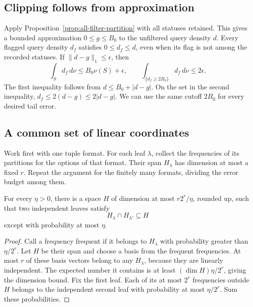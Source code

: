 \subsection{Clipping follows from approximation}\label{sec:partition-clipping}

Apply Proposition~\ref{prop:all-filter-partition} with all statuses retained. This
gives a bounded approximation \(0\le g\le B_0\) to the unfiltered query
density \(d\). Every flagged query density \(d_f\) satisfies
\(0\le d_f\le d\), even when its flag is not among the recorded statuses.
If \(\|d-g\|_1\le\epsilon\), then
\[
 \int_S d_f\,d\nu\le B_0\nu(S)+\epsilon,
 \qquad
 \int_{\{d_f\ge2B_0\}}d_f\,d\nu\le2\epsilon.
\]
The first inequality follows from \(d\le B_0+|d-g|\). On the set
in the second inequality, \(d_f\le2(d-g)\le2|d-g|\).
We can use the same cutoff \(2B_0\) for every desired tail error.

\subsection{A common set of linear coordinates}

Work first with one tuple format. For each leaf \(\lambda\), collect the
frequencies of its partitions for the options of that format. Their span
\(H_\lambda\) has dimension at most a fixed \(r\). Repeat the argument
for the finitely many formats, dividing the error budget among them.

\begin{lemma}\label{lem:common-frequencies}
For every \(\eta>0\), there is a space \(H\) of dimension at most
\(r2^r/\eta\), rounded up, such that two independent leaves satisfy
\begin{equation}\label{eq:frequency-intersection}
 H_\lambda\cap H_{\lambda'}\subseteq H
\end{equation}
except with probability at most \(\eta\).
\end{lemma}
\begin{proof}
Call a frequency frequent if it belongs to \(H_\lambda\) with
probability greater than \(\eta/2^r\). Let \(H\) be their span and
choose a basis from the frequent frequencies. At most \(r\) of these basis vectors belong to any \(H_\lambda\),
because they are linearly independent. The expected number it
contains is at least \((\dim H)\eta/2^r\), giving the dimension bound.
Fix the first leaf. Each of its at most \(2^r\) frequencies outside
\(H\) belongs to the independent second leaf with probability at most
\(\eta/2^r\). Sum these probabilities.
\end{proof}

